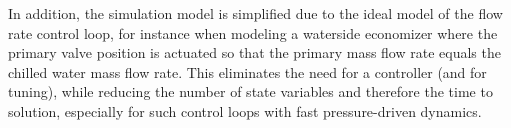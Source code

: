 \begin{appendix}
In addition, the simulation model is simplified due to the ideal model of the flow rate control loop, for instance when modeling a waterside economizer where the primary valve position is actuated so that the primary mass flow rate equals the chilled water mass flow rate. This eliminates the need for a controller (and for tuning), while reducing the number of state variables and therefore the time to solution, especially for such control loops with fast pressure-driven dynamics.

\end{appendix}
